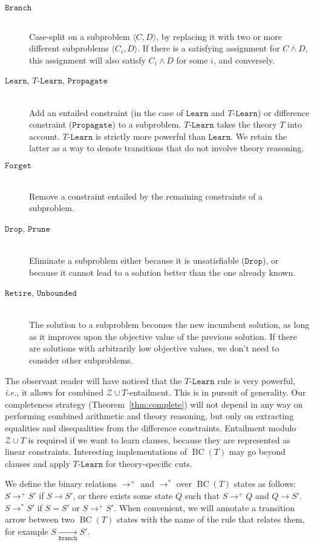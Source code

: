 \documentclass{llncs}
\newcommand{\ie}[0]{\emph{i.e.}, }
\newcommand{\tr}[1]{\ensuremath{\mathtt{#1}}}
\newcommand{\ttr}[1]{\ensuremath{T\text{-}\mathtt{#1}}}
\newcommand{\subp}[2]{\ensuremath{\langle#1, #2\rangle}}
\newcommand{\ZT}[0]{\ensuremath{\mathcal{Z} \cup T}}
\newcommand{\trans}[0]{\ensuremath{ \longrightarrow }}
\newcommand{\transplus}[0]{\ensuremath{ \longrightarrow^{+} }}
\newcommand{\transstar}[0]{\ensuremath{ \longrightarrow^{*} }}
\newcommand{\transannot}[1]{\underset{\tr{#1}}{\longrightarrow}}
\newcommand{\cd}{\subp{C}{D}}
\newcommand{\bct}[0]{\ensuremath{\operatorname{BC}(T)}}
\begin{document}
\begin{description}
\item[\tr{Branch}] \hfill \\
  Case-split on a subproblem \cd{}, by replacing it with two or more
  different subproblems $\subp{C_i}{D}$. If there is a satisfying
  assignment for $C \wedge D$, this assignment will also satisfy $C_i
  \wedge D$ for some $i$, and conversely.
\item[\tr{Learn}, \ttr{Learn}, \tr{Propagate}] \hfill \\
  Add an entailed constraint (in the case of \tr{Learn} and
  \ttr{Learn}) or difference constraint (\tr{Propagate}) to a
  subproblem. \ttr{Learn} takes the theory $T$ into
  account. \ttr{Learn} is strictly more powerful than \tr{Learn}. We
  retain the latter as a way to denote transitions that do not involve
  theory reasoning.
\item[\tr{Forget}] \hfill \\
  Remove a constraint entailed by the remaining constraints of a
  subproblem.
\item[\tr{Drop}, \tr{Prune}] \hfill \\
  Eliminate a subproblem either because it is unsatisfiable
  (\tr{Drop}), or because it cannot lead to a solution better than the
  one already known.
\item[\tr{Retire}, \tr{Unbounded}] \hfill \\
  The solution to a subproblem becomes the new incumbent solution, as
  long as it improves upon the objective value of the previous
  solution. If there are solutions with arbitrarily low objective
  values, we don't need to consider other subproblems.
\end{description}

The observant reader will have noticed that the \ttr{Learn} rule is
very powerful, \ie it allows for combined \ZT{}-entailment. This is in
pursuit of generality. Our completeness strategy
(Theorem~\ref{thm:complete}) will not depend in any way on performing
combined arithmetic and theory reasoning, but only on extracting
equalities and disequalities from the difference
constraints. Entailment modulo \ZT{} is required if we want to learn
clauses, because they are represented as linear
constraints. Interesting implementations of \bct{} may go beyond
clauses and apply \ttr{Learn} for theory-specific cuts.

We define the binary relations $\transplus$ and $\transstar$ over
\bct{} states as follows: $S \transplus S'$ if $S \trans S'$, or there
exists some state $Q$ such that $S \transplus Q$ and $Q \trans S'$. $S
\transstar S'$ if $S = S'$ or $S \transplus S'$. When convenient, we
will annotate a transition arrow between two \bct{} states with the
name of the rule that relates them, for example $S \transannot{Branch}
S'$.
\end{document}
